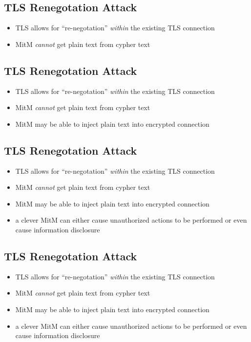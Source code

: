 \documentclass[xga]{xdvislides}
\begin{document}
\subsection{TLS Renegotation Attack}
\begin{itemize}
	\item TLS allows for ``re-negotation'' {\em within} the existing TLS
		connection
	\item MitM {\em cannot} get plain text from cypher text
\end{itemize}

\subsection{TLS Renegotation Attack}
\begin{itemize}
	\item TLS allows for ``re-negotation'' {\em within} the existing TLS
		connection
	\item MitM {\em cannot} get plain text from cypher text
	\item MitM may be able to inject plain text into encrypted connection
\end{itemize}

\subsection{TLS Renegotation Attack}
\begin{itemize}
	\item TLS allows for ``re-negotation'' {\em within} the existing TLS
		connection
	\item MitM {\em cannot} get plain text from cypher text
	\item MitM may be able to inject plain text into encrypted connection
	\item a clever MitM can either cause unauthorized actions to be performed
		or even cause information disclosure
\end{itemize}

\subsection{TLS Renegotation Attack}
\begin{itemize}
	\item TLS allows for ``re-negotation'' {\em within} the existing TLS
		connection
	\item MitM {\em cannot} get plain text from cypher text
	\item MitM may be able to inject plain text into encrypted connection
	\item a clever MitM can either cause unauthorized actions to be performed
		or even cause information disclosure
\end{itemize}
\addvspace{.5in}
\end{document}
